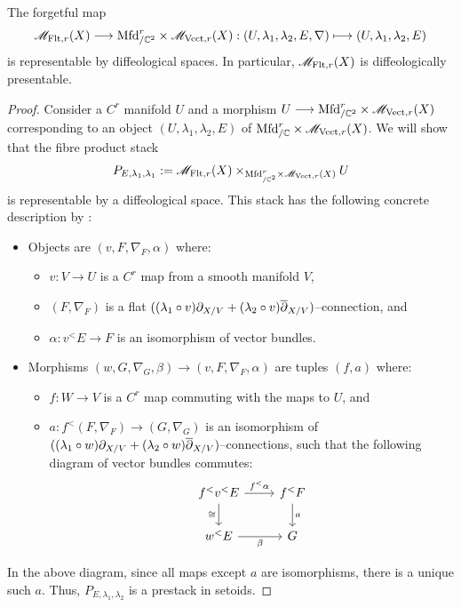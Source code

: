 \documentclass[11pt]{amsart}
\begin{document}
\begin{thm}\label{thm:M-Flt-r-dflg}
The forgetful map
\[
\sM_{\Flt, r}(X) \to \Mfd^r_{/\bC^2} \times \sM_{\Vect, r}(X)
: (U, \lambda_1, \lambda_2, E, \nabla) \mapsto (U, \lambda_1, \lambda_2, E)
\]
is representable by diffeological spaces. In particular, $\mathscr{M}_{\mathrm{Flt}, r}(X)$ is diffeologically
presentable.
\end{thm}
\begin{proof}
Consider a $C^r$ manifold $U$ and a morphism $U \to \Mfd^r_{/\bC^2} \times \sM_{\Vect, r}(X)$
corresponding to an object
$(U, \lambda_1, \lambda_2, E)$ of $\mathrm{Mfd}^r_{/\mathbb{C}} \times \mathscr{M}_{\mathrm{Vect}, r}(X)$.
We will show that the fibre product stack
\[
P_{E, \lambda_1, \lambda_1}
:= \mathscr{M}_{\mathrm{Flt}, r}(X) \times_{\mathrm{Mfd}^r_{/\mathbb{C}^2} \times \mathscr{M}_{\mathrm{Vect}, r}(X)} U
\]
is representable by a diffeological space.
This stack has the following concrete description by
\cite[\href{https://stacks.math.columbia.edu/tag/0040}{Tag 0040}]{stacks-project}:
\begin{itemize}
\item Objects are $(v, F, \nabla_F, \alpha)$ where:
    \begin{itemize}
    \item $v : V \to U$ is a $C^r$ map from a smooth manifold $V$,
    \item $(F, \nabla_F)$ is a flat
    $((\lambda_1 \circ v) \partial_{X/V} + (\lambda_2 \circ v)\overline{\partial}_{X/V})$--connection, and
    \item $\alpha : v^<E \to F$ is an isomorphism of vector bundles.
    \end{itemize}
\item Morphisms $(w, G, \nabla_G, \beta) \to (v, F, \nabla_F, \alpha)$ are tuples $(f, a)$ where:
    \begin{itemize}
    \item $f : W \to V$ is a $C^r$ map commuting with the maps to $U$, and
    \item $a : f^<(F, \nabla_F) \to (G, \nabla_G)$ is an isomorphism of
    $((\lambda_1 \circ w)\partial_{X/V} + (\lambda_2 \circ w)\overline{\partial}_{X/V})$--connections,
    such that the following diagram of vector bundles commutes:
    \[\begin{tikzcd}
    f^<v^<E \ar[r, "f^<\alpha"] \ar[d, "\cong" left] & f^<F \ar[d, "a"] \\
    w^<E \ar[r, "\beta" below] & G
    \end{tikzcd}\]
    \end{itemize}
\end{itemize}
In the above diagram, since all maps except $a$ are isomorphisms, there is a unique such $a$.
Thus, $P_{E, \lambda_1, \lambda_2}$ is a prestack in setoids.


\end{proof}
\end{document}
